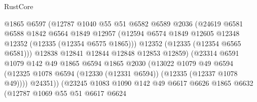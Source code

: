 \begin{lexlean}{RustCore}
\begin{coremodule}
                              @1865
                              @6597
                              (@12787
                                @1040
                                @55
                                @51
                                @6582
                                @6589
                                @2036
                                (@24619
                                  @6581
                                  @6588
                                  @1842
                                  @6564
                                  @1849
                                  @12957
                                  (@12594
                                    @6574
                                    @1849
                                    @12605
                                    @12348
                                    @12352
                                    (@12335 (@12354 @6575 @1865)))
                                  @12352
                                  (@12335 (@12354 @6565 @6581)))
                                @12838
                                @12841
                                @12844
                                @12848
                                @12853
                                @12859)
                              (@23314
                                @6591
                                @1079
                                @142
                                @49
                                @1865
                                @6594
                                @1865
                                @2030
                                (@13022
                                  @1079
                                  @49
                                  @6594
                                  (@12325
                                    @1078
                                    @6594
                                    (@12330 (@12331 @6594))
                                    (@12335 (@12337 @1078 @49))))
                                @24351))
                            (@23245
                              @1083
                              @1090
                              @142
                              @49
                              @6617
                              @6626
                              @1865
                              @6632
                              (@12787
                                @1069
                                @55
                                @51
                                @6617
                                @6624

\end{coremodule}
\end{lexlean}
